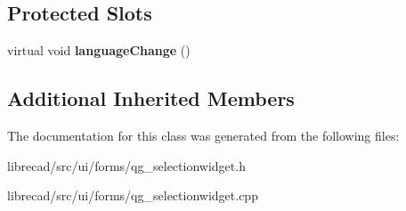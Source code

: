 \subsection*{Protected Slots}
\begin{DoxyCompactItemize}
\item 
\hypertarget{classQG__SelectionWidget_aa9f5b0b109a781516bade3c464842e4e}{virtual void {\bfseries language\-Change} ()}\label{classQG__SelectionWidget_aa9f5b0b109a781516bade3c464842e4e}

\end{DoxyCompactItemize}
\subsection*{Additional Inherited Members}


The documentation for this class was generated from the following files\-:\begin{DoxyCompactItemize}
\item 
librecad/src/ui/forms/qg\-\_\-selectionwidget.\-h\item 
librecad/src/ui/forms/qg\-\_\-selectionwidget.\-cpp\end{DoxyCompactItemize}
